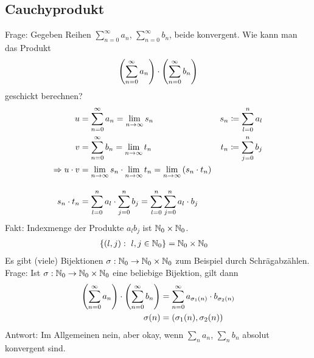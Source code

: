 \thispagestyle{pagenumberonly}

\subsection{Cauchyprodukt}
Frage: Gegeben Reihen $\sum_{n=0}^{\infty} a_n$, $\sum_{n=0}^{\infty} b_n$, beide konvergent. Wie kann man das Produkt
\begin{align*}
    \left(\sum_{n=0}^{\infty} a_n\right)\cdot\left(\sum_{n=0}^{\infty} b_n\right)
\end{align*}
geschickt berechnen?
\begin{alignat*}{2}
    u &= \sum_{n=0}^{\infty} a_n = \lim_{n\rightarrow{}\infty} s_n\quad &s_n \coloneqq \sum_{l=0}^{n} a_l\\
    v &= \sum_{n=0}^{\infty} b_n = \lim_{n\rightarrow{}\infty} t_n \quad &t_n \coloneqq \sum_{j=0}^{n} b_j\\
    \Rightarrow{} u\cdot v &= \lim_{n\rightarrow{}\infty} s_n \cdot \lim_{n\rightarrow{}\infty} t_n = \lim_{n\rightarrow{}\infty} \left(s_n\cdot t_n\right)\\[10pt]
    s_n \cdot t_n &= \sum_{l=0}^{n} a_l \cdot \sum_{j=0}^{n} b_j = \sum_{l=0}^{n} \sum_{j=0}^{n} a_l\cdot b_j
\end{alignat*}
Fakt: Indexmenge der Produkte $a_l b_j$ ist $\mathbb{N}_0 \times \mathbb{N}_0$.
\begin{align*}
    \left\{(l,j):~l,j\in\mathbb{N}_0\right\} &= \mathbb{N}_0\times\mathbb{N}_0
\end{align*}
Es gibt (viele) Bijektionen $\sigma: \mathbb{N}_0 \rightarrow{} \mathbb{N}_0\times\mathbb{N}_0$ zum Beispiel durch Schrägabzählen.\\
Frage: Ist $\sigma: \mathbb{N}_0 \rightarrow{} \mathbb{N}_0\times\mathbb{N}_0$ eine beliebige Bijektion, gilt dann
\begin{align*}
    \left(\sum_{n=0}^{\infty} a_n\right)\cdot\left(\sum_{n=0}^{\infty} b_n\right) &= \sum_{n=0}^{\infty} a_{\sigma_1(n)}\cdot b_{\sigma_2(n)}\\
    \sigma(n) &= \left(\sigma_1(n), \sigma_2(n)\right)
\end{align*}
Antwort: Im Allgemeinen nein, aber okay, wenn $\sum_{n}^{} a_n$, $\sum_{n}^{} b_n$ absolut konvergent sind.

